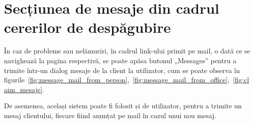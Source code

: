 \section{Secțiunea de mesaje din cadrul cererilor de despăgubire}

	În caz de probleme sau nelămuriri, în cadrul link-ului primit pe mail, o dată ce se navighează la pagina respectivă, se poate apăsa butonul „Messages” pentru a trimite într-un dialog mesaje de la client la utilizator, cum se poate observa în figurile~\ref{fig:message_mail_from_person},~\ref{fig:message_mail_from_office},~\ref{fig:claim_mesaje}.

	De asemenea, același sistem poate fi folosit și de utilizator, pentru a trimite un mesaj clientului, fiecare fiind anunțat pe mail în cazul unui nou mesaj.

	\begin{figure}
		\centering
		 \\
\end{figure}
